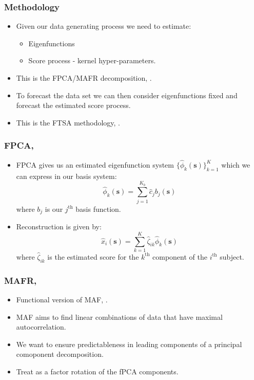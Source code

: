\documentclass[aspectratio=169]{beamer}
\newcommand{\ve}[1]{\bm{{#1}}}
\begin{document}
  \begin{frame}
    \frametitle{Methodology}
    \begin{itemize}
      \item Given our data generating process we need to estimate:
        \begin{itemize}
          \item Eigenfunctions
          \item Score process - kernel hyper-parameters.
        \end{itemize}
      \item This is the FPCA/MAFR decomposition, \cite{ramsay_functional_2010, hooker_maximal_2016}. 
      \item To forecast the data set we can then consider eigenfunctions fixed and forecast the estimated score process. 
      \item This is the FTSA methodology, \cite{shang_ftsa_2013}.
    \end{itemize}
  \end{frame}

  \begin{frame}
    \frametitle{FPCA, \cite{ramsay_functional_2010}}
      \begin{itemize}
        \item FPCA gives us an estimated eigenfunction system $\{\hat{\phi}_k(\ve{s})\}_{k=1}^K$ which we can express in our basis system:
          \begin{equation}
            \hat{\phi}_k(\ve{s}) = \sum_{j=1}^{K_b}\hat{c}_j b_j(\ve{s})
            \label{eqn:basis_ef}
          \end{equation}
          where $b_j$ is our $j^\text{th}$ basis function.
        \item Reconstruction is given by:
          \begin{equation}
            \hat{x}_i(\ve{s}) = \sum_{k=1}^K \hat{\zeta}_{ik} \hat{\phi}_k(\ve{s})
            \label{eqn:fpca}
          \end{equation}
          where $\hat{\zeta}_{ik}$ is the estimated score for the $k^\text{th}$ component of the $i^\text{th}$ subject.
      \end{itemize}
  \end{frame}

  \begin{frame}
    \frametitle{MAFR, \cite{hooker_maximal_2016}}
      \begin{itemize}
        \item Functional version of MAF, \cite{switzer_minmax_1984}.
        \item MAF aims to find linear combinations of data that have maximal autocorrelation. 
        \item We want to ensure predictableness in leading components of a principal comoponent decomposition.
        \item Treat as a factor rotation of the fPCA components. 
      \end{itemize}
  \end{frame}
  
\end{document}
